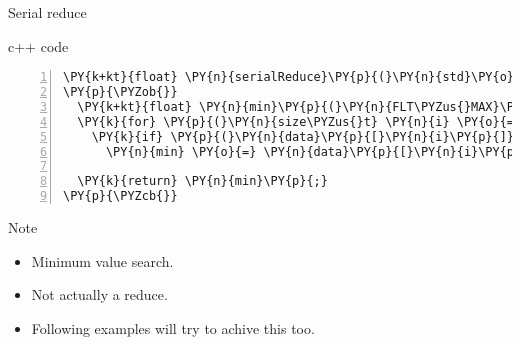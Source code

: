 \documentclass{beamer}
\begin{document}


\begin{frame}[fragile]{Serial reduce}

\begin{block}{c++ code}

\tiny
\begin{Verbatim}[commandchars=\\\{\},numbers=left,firstnumber=1,stepnumber=1]
\PY{k+kt}{float} \PY{n}{serialReduce}\PY{p}{(}\PY{n}{std}\PY{o}{:}\PY{o}{:}\PY{n}{vector}\PY{o}{<}\PY{k+kt}{float}\PY{o}{>}\PY{o}{&} \PY{n}{data}\PY{p}{)}
\PY{p}{\PYZob{}}
  \PY{k+kt}{float} \PY{n}{min}\PY{p}{(}\PY{n}{FLT\PYZus{}MAX}\PY{p}{)}\PY{p}{;}
  \PY{k}{for} \PY{p}{(}\PY{n}{size\PYZus{}t} \PY{n}{i} \PY{o}{=} \PY{l+m+mi}{0}\PY{p}{;} \PY{n}{i} \PY{o}{<} \PY{n}{data}\PY{p}{.}\PY{n}{size}\PY{p}{(}\PY{p}{)}\PY{p}{;} \PY{n}{i}\PY{o}{+}\PY{o}{+}\PY{p}{)}
    \PY{k}{if} \PY{p}{(}\PY{n}{data}\PY{p}{[}\PY{n}{i}\PY{p}{]} \PY{o}{<} \PY{n}{min}\PY{p}{)}
      \PY{n}{min} \PY{o}{=} \PY{n}{data}\PY{p}{[}\PY{n}{i}\PY{p}{]}\PY{p}{;}

  \PY{k}{return} \PY{n}{min}\PY{p}{;}
\PY{p}{\PYZcb{}}
\end{Verbatim}

\end{block}

\begin{exampleblock}{Note}
  \small
  \begin{itemize}
    \item Minimum value search.
    \item Not actually a reduce.
    \item Following examples will try to achive this too.
  \end{itemize}
\end{exampleblock}

\end{frame}

\end{document}
